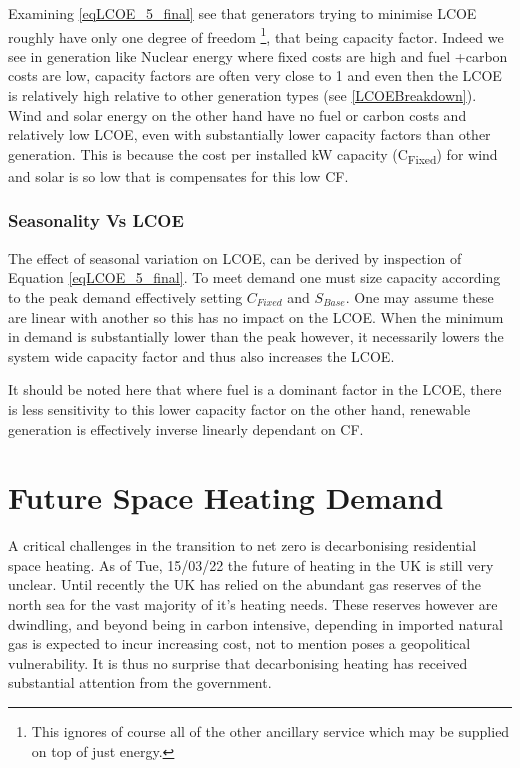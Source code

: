 \documentclass[11pt]{article}
\numberwithin{equation}{section}
\begin{document}
Examining \ref{eqLCOE_5_final} see that generators trying to minimise LCOE roughly have only one degree of freedom \footnote{This ignores of course all of the other ancillary service which may be supplied on top of just energy.}, that being capacity factor. Indeed we see in generation like Nuclear energy where fixed costs are high and fuel +carbon costs are low, capacity factors are often very close to 1 and even then the LCOE is relatively high relative to other generation types (see \ref{LCOEBreakdown}). Wind and solar energy on the other hand have no fuel or carbon costs and relatively low LCOE, even with substantially lower capacity factors than other generation. This is because the cost per installed kW capacity (C\textsubscript{Fixed}) for wind and solar is so low that is compensates for this low CF.
\subsubsection{Seasonality Vs LCOE \label{secSeasonalityVsLSCO}}
\label{sec:org5f1504b}
The effect of seasonal variation on LCOE, can be derived by inspection of Equation \ref{eqLCOE_5_final}. To meet demand one must size capacity according to the peak demand effectively setting \(C_{Fixed}\) and \(S_{Base}\). One may assume these are linear with another so this has no impact on the LCOE. When the minimum in demand is substantially lower than the peak however, it necessarily lowers the system wide capacity factor and thus also increases the LCOE.

It should be noted here that where fuel is a dominant factor in the LCOE, there is less sensitivity to this lower capacity factor on the other hand, renewable generation is effectively inverse linearly dependant on CF.

\section{Future Space Heating Demand \label{secHeating}}
\label{sec:orgbbae687}
A critical challenges in the transition to net zero is decarbonising residential space heating. As of Tue, 15/03/22 the future of heating in the UK is still very unclear. Until recently the UK has relied on the abundant gas reserves of the north sea for the vast majority of it's heating needs. These reserves however are dwindling, and beyond being in carbon intensive, depending in imported natural gas is expected to incur increasing cost, not to mention poses a geopolitical vulnerability. It is thus no surprise that decarbonising heating has received substantial attention from the government.
\end{document}
